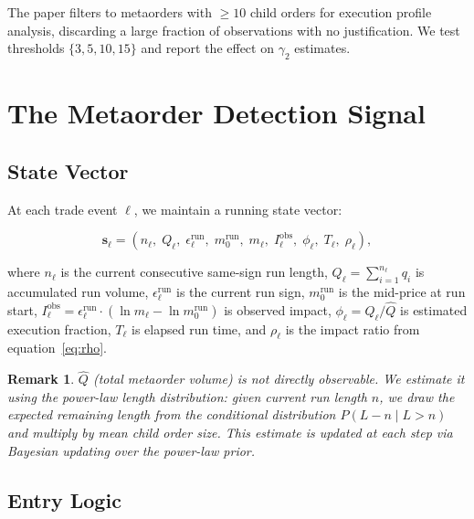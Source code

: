 \documentclass[12pt,a4paper]{article}
\newtheorem{remark}{Remark}
\begin{document}
The paper filters to metaorders with $\geq 10$ child orders for execution
profile analysis, discarding a large fraction of observations with no
justification. We test thresholds $\{3, 5, 10, 15\}$ and report the effect on
$\gamma_2$ estimates.

\section{The Metaorder Detection Signal}
\label{sec:signal}

\subsection{State Vector}

At each trade event $\ell$, we maintain a running state vector:

\begin{equation}
  \mathbf{s}_\ell = \left(
    n_\ell,\;
    Q_\ell,\;
    \epsilon_\ell^{\text{run}},\;
    m_0^{\text{run}},\;
    m_\ell,\;
    I_\ell^{\text{obs}},\;
    \phi_\ell,\;
    T_\ell,\;
    \rho_\ell
  \right),
  \label{eq:state}
\end{equation}

\noindent where $n_\ell$ is the current consecutive same-sign run length,
$Q_\ell = \sum_{i=1}^{n_\ell} q_i$ is accumulated run volume,
$\epsilon_\ell^{\text{run}}$ is the current run sign,
$m_0^{\text{run}}$ is the mid-price at run start,
$I_\ell^{\text{obs}} = \epsilon_\ell^{\text{run}} \cdot (\ln m_\ell - \ln m_0^{\text{run}})$
is observed impact, $\phi_\ell = Q_\ell / \hat{Q}$ is estimated execution
fraction, $T_\ell$ is elapsed run time, and $\rho_\ell$ is the impact ratio
from equation~\eqref{eq:rho}.

\begin{remark}
$\hat{Q}$ (total metaorder volume) is not directly observable. We estimate it
using the power-law length distribution: given current run length $n$, we draw
the expected remaining length from the conditional distribution
$P(L - n \mid L > n)$ and multiply by mean child order size. This estimate is
updated at each step via Bayesian updating over the power-law prior.
\end{remark}

\subsection{Entry Logic}
\end{document}
